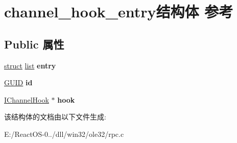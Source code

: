 \hypertarget{structchannel__hook__entry}{}\section{channel\+\_\+hook\+\_\+entry结构体 参考}
\label{structchannel__hook__entry}
\subsection*{Public 属性}
\begin{DoxyCompactItemize}
\item 
\mbox{\label{structchannel__hook__entry_a9a55af27fa810f19185bbe9079fd4a7f}} 
\hyperlink{interfacestruct}{struct} \hyperlink{classlist}{list} {\bfseries entry}
\item 
\mbox{\label{structchannel__hook__entry_afd5a1afa10cc1aa5d6f47a556f0758cc}} 
\hyperlink{interface_g_u_i_d}{G\+U\+ID} {\bfseries id}
\item 
\mbox{\label{structchannel__hook__entry_a5eb83bf73d008046564f6fbf4763c508}} 
\hyperlink{interface_i_channel_hook}{I\+Channel\+Hook} $\ast$ {\bfseries hook}
\end{DoxyCompactItemize}


该结构体的文档由以下文件生成\+:\begin{DoxyCompactItemize}
\item 
E\+:/\+React\+O\+S-\/0../dll/win32/ole32/rpc.\+c\end{DoxyCompactItemize}
